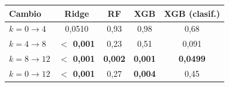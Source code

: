 \begin{tabular}{@{}lcccc@{}}
\toprule
Cambio & Ridge & RF & XGB & XGB (clasif.) \\
\midrule
$k=0 \rightarrow 4$ & 0,0510 & 0,93 & 0,98 & 0,68 \\
$k=4 \rightarrow 8$ & \textbf{$<$ 0,001} & 0,23 & 0,51 & 0,091 \\
$k=8 \rightarrow 12$ & \textbf{$<$ 0,001} & \textbf{0,002} & \textbf{0,001} & \textbf{0,0499} \\
$k=0 \rightarrow 12$ & \textbf{$<$ 0,001} & 0,27 & \textbf{0,004} & 0,45 \\
\bottomrule
\end{tabular}

